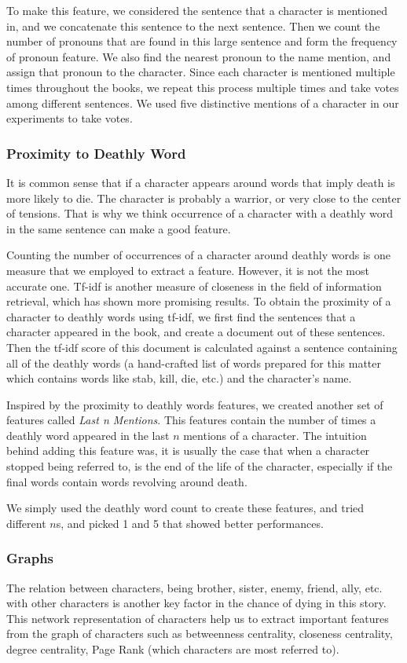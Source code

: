 \documentclass[letterpaper]{article}
\begin{document}
To make this feature, we considered the sentence that a character is mentioned in, and we concatenate this sentence to the next sentence. Then we count the number of pronouns that are found in this large sentence and form the frequency of pronoun feature. We also find the nearest pronoun to the name mention, and assign that pronoun to the character. Since each character is mentioned multiple times throughout the books, we repeat this process multiple times and take votes among different sentences. We used five distinctive mentions of a character in our experiments to take votes.


\subsubsection{Proximity to Deathly Word}
It is common sense that if a character appears around words that imply death is more likely to die. The character is probably a warrior, or very close to the center of tensions. That is why we think occurrence of a character with a deathly word in the same sentence can make a good feature. 

Counting the number of occurrences of a character around deathly words is one measure that we employed to extract a feature. However, it is not the most accurate one. Tf-idf is another measure of closeness in the field of information retrieval, which has shown more promising results. To obtain the proximity of a character to deathly words using tf-idf, we first find the sentences that a character appeared in the book, and create a document out of these sentences. Then the tf-idf score of this document is calculated against a sentence containing all of the deathly words (a hand-crafted list of words prepared for this matter which contains words like stab, kill, die, etc.) and the character's name.


Inspired by the proximity to deathly words features, we created another set of features called \textit{Last n Mentions}. This features contain the number of times a deathly word appeared in the last $n$ mentions of a character. The intuition behind adding this feature was, it is usually the case that when a character stopped being referred to, is the end of the life of the character, especially if the final words contain words revolving around death.

We simply used the deathly word count to create these features, and tried different $n$s, and picked 1 and 5 that showed better performances.


\subsubsection{Graphs}
The relation between characters, being brother, sister, enemy, friend, ally, etc. with other characters is another key factor in the chance of dying in this story. This network representation of characters help us to extract important features from the graph of characters such as betweenness centrality, closeness centrality, degree centrality, Page Rank (which characters are most referred to).
\end{document}
